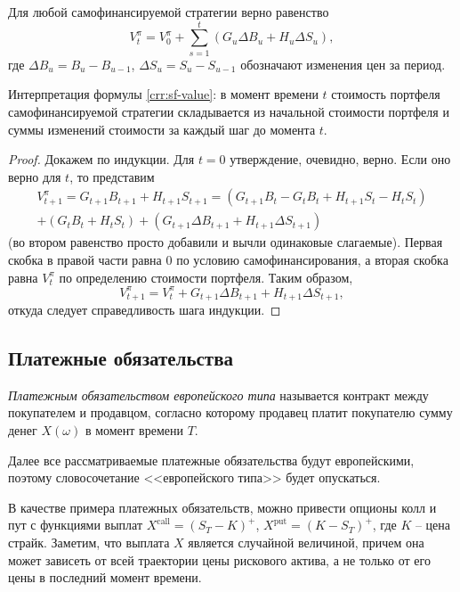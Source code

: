\begin{proposition}
\label{crr:p:sf-value}
Для любой самофинансируемой стратегии верно равенство
\begin{equation}
\label{crr:sf-value}
V_t^\pi = V_0^\pi + \sum_{s=1}^t (G_u \Delta B_u + H_u\Delta S_u),
\end{equation}
где $\Delta B_u = B_u - B_{u-1}$, $\Delta S_u = S_u - S_{u-1}$ обозначают изменения цен за период.
\end{proposition}
Интерпретация формулы \eqref{crr:sf-value}: в момент времени $t$ стоимость портфеля самофинансируемой стратегии складывается из начальной стоимости портфеля и суммы изменений стоимости за каждый шаг до момента $t$.
\begin{proof}
Докажем по индукции.
Для $t=0$ утверждение, очевидно, верно.
Если оно верно для $t$, то представим
\begin{multline*}
V_{t+1}^\pi = G_{t+1}B_{t+1} + H_{t+1}S_{t+1} 
= (G_{t+1}B_{t} - G_tB_t + H_{t+1}S_t - H_tS_t)
\\+ (G_tB_t + H_tS_t) + (G_{t+1}\Delta B_{t+1} + H_{t+1}\Delta S_{t+1})
\end{multline*}
(во втором равенство просто добавили и вычли одинаковые слагаемые).
Первая скобка в правой части равна 0 по условию самофинансирования, а вторая скобка равна $V_t^\pi$ по определению стоимости портфеля.
Таким образом,
\[
V_{t+1}^\pi = V_t^\pi + G_{t+1}\Delta B_{t+1} + H_{t+1}\Delta S_{t+1},
\]
откуда следует справедливость шага индукции.
\end{proof}


\subsection{Платежные обязательства}

\begin{definition}
\emph{Платежным обязательством европейского типа} называется контракт между покупателем и продавцом, согласно которому продавец платит покупателю сумму денег $X(\omega)$ в момент времени $T$. 
\end{definition}

Далее все рассматриваемые платежные обязательства будут европейскими, поэтому словосочетание <<европейского типа>> будет опускаться. 


В качестве примера платежных обязательств, можно привести опционы колл и пут с функциями выплат $X^\text{call} = (S_T- K)^+$, $X^\text{put} = (K-S_T)^+$, где $K$ -- цена страйк. Заметим, что выплата $X$ является случайной величиной, причем она может зависеть от всей траектории цены рискового актива, а не только от его цены в последний момент времени.


